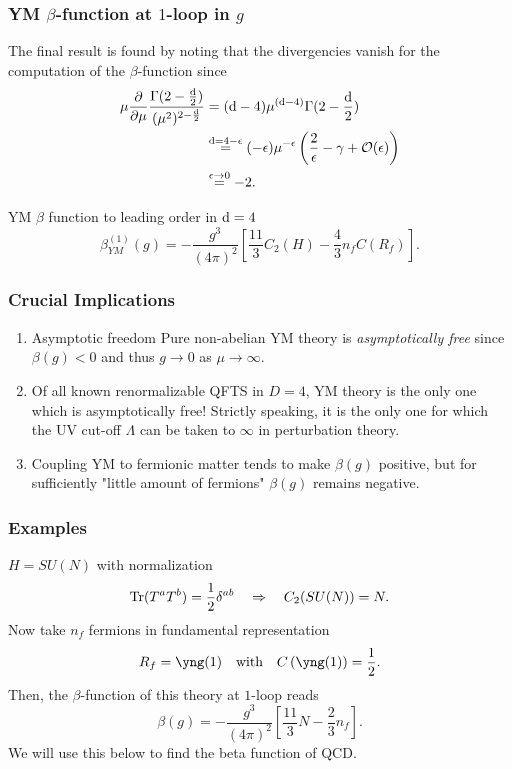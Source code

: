  \subsubsection{YM  $\beta$-function at $1$-loop in $g$}
The final result is found by noting that the divergencies vanish for the computation of the $\beta$-function since
\begin{align*}
	\mu \frac{\partial}{\partial \mu} \frac{\Gamma(2 -\frac{\mathrm{d}}{2})}{(\mu^2)^{2-\frac{\mathrm{d}}{2}} } &= (\mathrm{d} -4) \mu^{(\mathrm{d}-4)} \Gamma(2-\frac{\mathrm{d}}{2}) \\
	&\stackrel{\mathrm{d}=4-\epsilon}{=} (-\epsilon) \mu^{-\epsilon} \left(\frac{2}{\epsilon} -\gamma + \mathcal{O}(\epsilon)\right) \\
	&\stackrel{\epsilon\rightarrow 0}{=} -2.
\end{align*}
\begin{mybox}{YM $\beta$ function to leading order in $\mathrm{d}=4$}
	\begin{equation}
		\label{eq:betafunctionYangMills}
		\beta^{(1)}_{YM}(g) = - \frac{g^3}{(4 \pi)^2} \left[\frac{11}{3} C_2(H) - \frac{4}{3} n_f C(R_f)\right].
	\end{equation}
\end{mybox}
\subsubsection{Crucial Implications}
\begin{enumerate}
	\item \begin{mybox}{Asymptotic freedom}
	Pure non-abelian YM theory is \emph{asymptotically free} since $\beta(g)<0$ and thus $g\rightarrow 0$ as $\mu \rightarrow\infty$.
	\end{mybox}
\item \begin{mybox}{}	
	Of all known renormalizable QFTS in $D=4$, YM theory is the only one which is asymptotically free!
	Strictly speaking, it is the only one for which the UV cut-off $\Lambda$ can be taken to $\infty$ in perturbation theory.
\end{mybox}
	\item Coupling YM to fermionic matter tends to make $\beta(g)$ positive, but for sufficiently "little amount of fermions" $\beta(g)$ remains negative.
\end{enumerate}
\subsubsection{Examples}
$H=SU(N)$ with normalization 
\begin{equation}
	\mathrm{Tr}(T^a T^b) = \frac{1}{2} \delta^{ab} \quad \Rightarrow \quad  C_2(SU(N)) = N.
\end{equation}
Now take $n_f$ fermions in fundamental representation
\begin{equation*}
	R_f = \yng(1) \quad \text{with} \quad C\left(\yng(1)\right)=\half.
\end{equation*}
Then, the $\beta$-function of this theory at $1$-loop reads
\begin{equation}
	\beta(g) = -\frac{g^3}{(4\pi)^2} \left[\frac{11}{3} N-\frac{2}{3}n_f\right].
\end{equation}
We will use this below to find the beta function of QCD.
